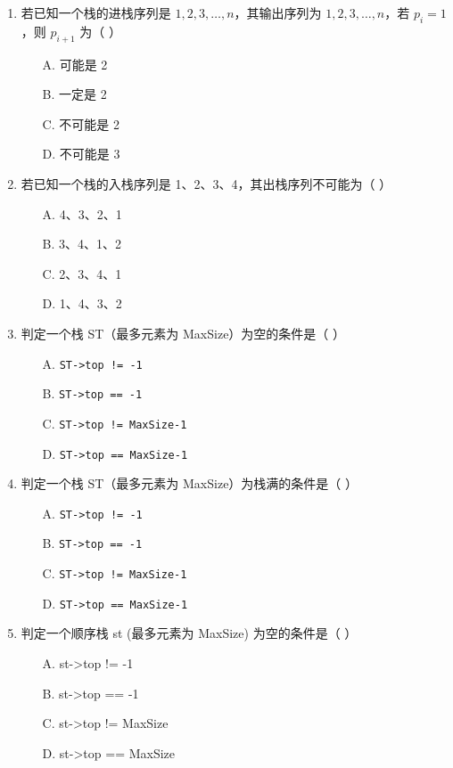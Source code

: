 \documentclass[12pt, a4paper]{article}
\begin{document}
\begin{enumerate}[label=\arabic*.]
	\item 若已知一个栈的进栈序列是 $1, 2, 3, \dots, n$，其输出序列为 $1, 2, 3, \dots, n$，若 $p_i=1$，则 $p_{i+1}$ 为（ ）
	      \begin{enumerate}
		      \item[A.] 可能是 2
		      \item[B.] 一定是 2
		      \item[C.] 不可能是 2
		      \item[D.] 不可能是 3
	      \end{enumerate}

	\item 若已知一个栈的入栈序列是 1、2、3、4，其出栈序列不可能为（ ）
	      \begin{enumerate}
		      \item[A.] 4、3、2、1
		      \item[B.] 3、4、1、2
		      \item[C.] 2、3、4、1
		      \item[D.] 1、4、3、2
	      \end{enumerate}

	\item 判定一个栈 ST（最多元素为 MaxSize）为空的条件是（ ）
	      \begin{enumerate}
		      \item[A.] \texttt{ST->top != -1}
		      \item[B.] \texttt{ST->top == -1}
		      \item[C.] \texttt{ST->top != MaxSize-1}
		      \item[D.] \texttt{ST->top == MaxSize-1}
	      \end{enumerate}

	\item 判定一个栈 ST（最多元素为 MaxSize）为栈满的条件是（ ）
	      \begin{enumerate}
		      \item[A.] \texttt{ST->top != -1}
		      \item[B.] \texttt{ST->top == -1}
		      \item[C.] \texttt{ST->top != MaxSize-1}
		      \item[D.] \texttt{ST->top == MaxSize-1}
	      \end{enumerate}

	\item 判定一个顺序栈 st (最多元素为 MaxSize) 为空的条件是（ ）
	      \begin{enumerate}
		      \item[A.] st->top != -1
		      \item[B.] st->top == -1
		      \item[C.] st->top != MaxSize
		      \item[D.] st->top == MaxSize
	      \end{enumerate}


\end{enumerate}
\end{document}
